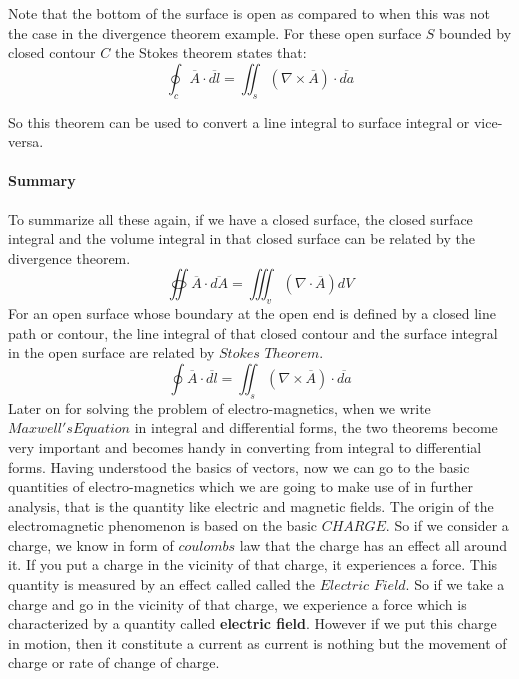 Note that the bottom of the surface is open as compared to when this was not the case in the divergence theorem example. For these open surface $S$ bounded by closed contour $C$ the Stokes theorem states that:
\begin{equation}
\oint_c \overline{A} \cdot \overline{dl} = \iint_s  (\nabla \times \overline{A})\cdot\overline{da}
\end{equation}

So this theorem can be used to convert a line integral to surface integral or vice-versa.\newline

\paragraph{Summary}
To summarize all these again, if we have a closed surface, the closed surface integral and the volume integral in that closed surface can be related by the divergence theorem.
\begin{equation}
\oiint \overline{A}\cdot\overline{dA} = \iiint_v(\nabla\cdot\overline{A})dV
\end{equation}
For an open surface whose boundary at the open end is defined by a closed line path or contour, the line integral of that closed contour and the surface integral in the open surface are related by $Stokes$ $Theorem$.
\begin{equation}
\oint\overline{A}\cdot\overline{dl} = \iint_s(\nabla\times\overline{A})\cdot\overline{da}
\end{equation}	
Later on for solving the problem of electro-magnetics, when we write $Maxwell's Equation$ in integral and differential forms, the two theorems become very important and becomes handy in converting from integral to differential forms. Having understood the basics of vectors, now we can go to the basic quantities of electro-magnetics which we are going to make use of in further analysis, that is the quantity like electric and magnetic fields.\newline
The origin of the electromagnetic phenomenon is based on the basic $CHARGE$. So if we consider a charge, we know in form of $coulombs$ law that the charge has an effect all around it. If you put a charge in the vicinity of that charge, it experiences a force. This quantity is measured by an effect called called the $Electric$ $Field$.
So if we take a charge and go in the vicinity of that charge, we experience a force which is characterized by a quantity called \textbf{electric field}.
However if we put this charge in motion, then it constitute a current as current is nothing but the movement of charge or rate of change of charge.\newline

